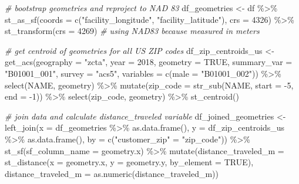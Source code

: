 \documentclass[
  11 pt,
  openany]{book}
\newenvironment{Shaded}{\begin{snugshade}}{\end{snugshade}}
\newcommand{\AttributeTok}[1]{\textcolor[rgb]{0.77,0.63,0.00}{#1}}
\newcommand{\CommentTok}[1]{\textcolor[rgb]{0.56,0.35,0.01}{\textit{#1}}}
\newcommand{\ConstantTok}[1]{\textcolor[rgb]{0.00,0.00,0.00}{#1}}
\newcommand{\DecValTok}[1]{\textcolor[rgb]{0.00,0.00,0.81}{#1}}
\newcommand{\FunctionTok}[1]{\textcolor[rgb]{0.00,0.00,0.00}{#1}}
\newcommand{\NormalTok}[1]{#1}
\newcommand{\OtherTok}[1]{\textcolor[rgb]{0.56,0.35,0.01}{#1}}
\newcommand{\SpecialCharTok}[1]{\textcolor[rgb]{0.00,0.00,0.00}{#1}}
\newcommand{\StringTok}[1]{\textcolor[rgb]{0.31,0.60,0.02}{#1}}
\begin{document}
\begin{Shaded}
\begin{Highlighting}[]
\CommentTok{\# bootstrap geometries and reproject to NAD 83}
\NormalTok{df\_geometries }\OtherTok{\textless{}{-}}\NormalTok{ df }\SpecialCharTok{\%\textgreater{}\%} 
  \FunctionTok{st\_as\_sf}\NormalTok{(}\AttributeTok{coords =} \FunctionTok{c}\NormalTok{(}\StringTok{"facility\_longitude"}\NormalTok{, }\StringTok{"facility\_latitude"}\NormalTok{),}
           \AttributeTok{crs =} \DecValTok{4326}\NormalTok{) }\SpecialCharTok{\%\textgreater{}\%} 
  \FunctionTok{st\_transform}\NormalTok{(}\AttributeTok{crs =} \DecValTok{4269}\NormalTok{) }\CommentTok{\# using NAD83 because measured in meters}

\CommentTok{\# get centroid of geometries for all US ZIP codes }
\NormalTok{df\_zip\_centroids\_us }\OtherTok{\textless{}{-}} 
  \FunctionTok{get\_acs}\NormalTok{(}\AttributeTok{geography =} \StringTok{"zcta"}\NormalTok{, }\AttributeTok{year =} \DecValTok{2018}\NormalTok{, }
          \AttributeTok{geometry =} \ConstantTok{TRUE}\NormalTok{, }
          \AttributeTok{summary\_var =} \StringTok{"B01001\_001"}\NormalTok{,}
          \AttributeTok{survey =} \StringTok{"acs5"}\NormalTok{,}
          \AttributeTok{variables =} \FunctionTok{c}\NormalTok{(}\AttributeTok{male =} \StringTok{"B01001\_002"}\NormalTok{)) }\SpecialCharTok{\%\textgreater{}\%} 
  \FunctionTok{select}\NormalTok{(NAME, geometry) }\SpecialCharTok{\%\textgreater{}\%} 
  \FunctionTok{mutate}\NormalTok{(}\AttributeTok{zip\_code =} \FunctionTok{str\_sub}\NormalTok{(NAME, }\AttributeTok{start =} \SpecialCharTok{{-}}\DecValTok{5}\NormalTok{, }\AttributeTok{end =} \SpecialCharTok{{-}}\DecValTok{1}\NormalTok{)) }\SpecialCharTok{\%\textgreater{}\%} 
  \FunctionTok{select}\NormalTok{(zip\_code, geometry) }\SpecialCharTok{\%\textgreater{}\%} 
  \FunctionTok{st\_centroid}\NormalTok{()}

\CommentTok{\# join data and calculate \textasciigrave{}distance\_traveled\textasciigrave{} variable}
\NormalTok{df\_joined\_geometries }\OtherTok{\textless{}{-}} 
  \FunctionTok{left\_join}\NormalTok{(}\AttributeTok{x =}\NormalTok{ df\_geometries }\SpecialCharTok{\%\textgreater{}\%} \FunctionTok{as.data.frame}\NormalTok{(),}
            \AttributeTok{y =}\NormalTok{ df\_zip\_centroids\_us }\SpecialCharTok{\%\textgreater{}\%} \FunctionTok{as.data.frame}\NormalTok{(), }
            \AttributeTok{by =} \FunctionTok{c}\NormalTok{(}\StringTok{"customer\_zip"} \OtherTok{=} \StringTok{"zip\_code"}\NormalTok{)) }\SpecialCharTok{\%\textgreater{}\%}
  \FunctionTok{st\_sf}\NormalTok{(}\AttributeTok{sf\_column\_name =} \StringTok{\textquotesingle{}geometry.x\textquotesingle{}}\NormalTok{) }\SpecialCharTok{\%\textgreater{}\%} 
  \FunctionTok{mutate}\NormalTok{(}\AttributeTok{distance\_traveled\_m =} \FunctionTok{st\_distance}\NormalTok{(}\AttributeTok{x =}\NormalTok{ geometry.x, }
                                           \AttributeTok{y =}\NormalTok{ geometry.y,}
                                           \AttributeTok{by\_element =} \ConstantTok{TRUE}\NormalTok{),}
         \AttributeTok{distance\_traveled\_m =} \FunctionTok{as.numeric}\NormalTok{(distance\_traveled\_m)) }
\end{Highlighting}
\end{Shaded}
\end{document}
